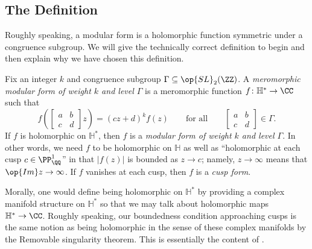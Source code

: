 \documentclass{amsart}
\begin{document}
\subsection{The Definition}
Roughly speaking, a modular form is a holomorphic function symmetric under a congruence subgroup. We will give the technically correct definition to begin and then explain why we have chosen this definition.
\begin{definition}
	Fix an integer $k$ and congruence subgroup $\Gamma\subseteq\op{SL}_2(\ZZ)$. A \textit{meromorphic modular form of weight $k$ and level $\Gamma$} is a meromorphic function $f\colon\mathbb H^*\to\CC$ such that
	\begin{equation}
		f\left(\begin{bmatrix}
			a & b \\
			c & d
		\end{bmatrix}z\right)=(cz+d)^kf(z)\qquad\text{for all}\qquad\begin{bmatrix}
			a & b \\
			c & d
		\end{bmatrix}\in\Gamma. \label{eq:symmetry-condition}
	\end{equation}
	If $f$ is holomorphic on $\mathbb H^*$, then $f$ is a \textit{modular form of weight $k$ and level $\Gamma$}. In other words, we need $f$ to be holomorphic on $\mathbb H$ as well as ``holomorphic at each cusp $c\in\PP^1_\QQ$'' in that $|f(z)|$ is bounded as $z\to c$; namely, $z\to\infty$ means that $\op{Im}z\to\infty$. If $f$ vanishes at each cusp, then $f$ is a \textit{cusp form}.
\end{definition}
\begin{remark}
	Morally, one would define being holomorphic on $\mathbb H^*$ by providing a complex manifold structure on $\mathbb H^*$ so that we may talk about holomorphic maps $\mathbb H^*\to\CC$. Roughly speaking, our boundedness condition approaching cusps is the same notion as being holomorphic in the sense of these complex manifolds by the Removable singularity theorem. This is essentially the content of .
\end{remark}
\end{document}
